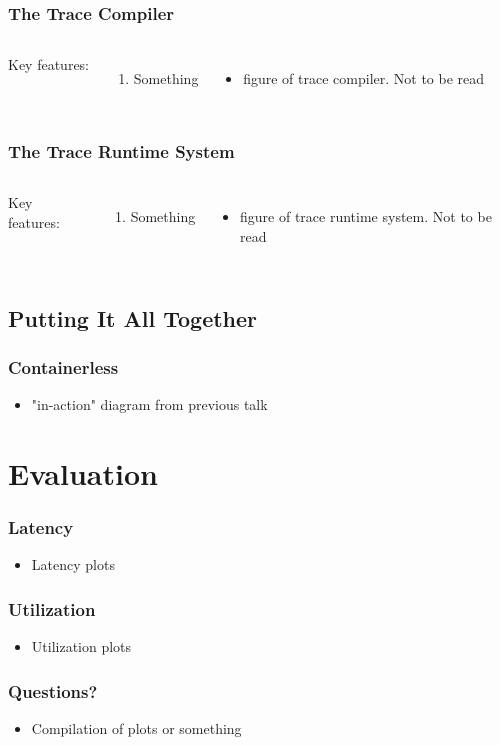 \documentclass{beamer}
\begin{document}
\begin{frame}
\frametitle{The Trace Compiler}
\begin{columns}
Key features:
\begin{enumerate}
    \item Something
\end{enumerate}
\begin{itemize}
    \item figure of trace compiler. Not to be read
\end{itemize}
\end{columns}
\end{frame}

\begin{frame}
\frametitle{The Trace Runtime System}
\begin{columns}
Key features:
\begin{enumerate}
    \item Something
\end{enumerate}
\begin{itemize}
    \item figure of trace runtime system. Not to be read
\end{itemize}
\end{columns}
\end{frame}

\subsection{Putting It All Together}

\begin{frame}
\frametitle{Containerless}
\begin{itemize}
    \item "in-action" diagram from previous talk
\end{itemize}
\end{frame}

\section{Evaluation}
\frame{\tableofcontents[currentsection]}

\begin{frame}
\frametitle{Latency}
\begin{itemize}
    \item Latency plots
\end{itemize}
\end{frame}

\begin{frame}
\frametitle{Utilization}
\begin{itemize}
    \item Utilization plots
\end{itemize}
\end{frame}

\begin{frame}
\frametitle{Questions?}
\begin{itemize}
    \item Compilation of plots or something
\end{itemize}
\end{frame}
\end{document}
